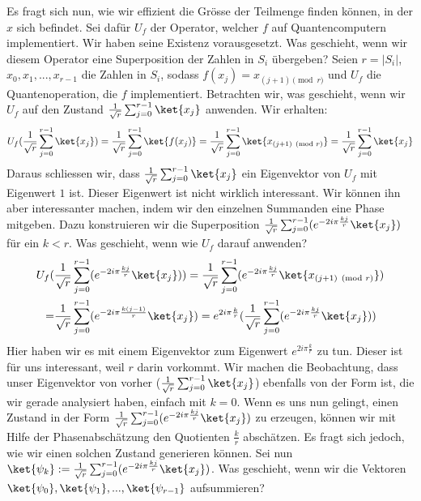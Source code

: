 Es fragt sich nun, wie wir effizient die Grösse der Teilmenge finden können, in der $x$ sich befindet. Sei dafür $U_f$ der Operator, welcher $f$ auf Quantencomputern implementiert. Wir haben seine Existenz vorausgesetzt. Was geschieht, wenn wir diesem Operator eine Superposition der Zahlen in $S_i$ übergeben? Seien $r = |S_i|$, $x_0, x_1, ..., x_{r - 1}$ die Zahlen in $S_i$, sodass $f(x_j) = x_{(j + 1) \pmod{r}}$ und $U_f$ die Quantenoperation, die $f$ implementiert. Betrachten wir, was geschieht, wenn wir $U_f$ auf den Zustand $\frac{1}{\sqrt{r}}\sum_{j = 0}^{r - 1}\ket{x_j}$ anwenden. Wir erhalten:
\begin{align*}
    U_f(\frac{1}{\sqrt{r}}\sum_{j = 0}^{r - 1}\ket{x_j}) = \frac{1}{\sqrt{r}}\sum_{j = 0}^{r - 1}\ket{f(x_j)} = \frac{1}{\sqrt{r}}\sum_{j = 0}^{r - 1}\ket{x_{(j + 1) \pmod{r}}} = \frac{1}{\sqrt{r}}\sum_{j = 0}^{r - 1}\ket{x_j}
\end{align*}
Daraus schliessen wir, dass $\frac{1}{\sqrt{r}}\sum_{j = 0}^{r - 1}\ket{x_j}$ ein Eigenvektor von $U_f$ mit Eigenwert $1$ ist. Dieser Eigenwert ist nicht wirklich interessant. Wir können ihn aber interessanter machen, indem wir den einzelnen Summanden eine Phase mitgeben. Dazu konstruieren wir die Superposition $\frac{1}{\sqrt{r}}\sum_{j = 0}^{r - 1}(e^{-2i\pi\frac{kj}{r}}\ket{x_j})$ für ein $k < r$. Was geschieht, wenn wie $U_f$ darauf anwenden? 
\begin{align*}
    U_f(&\frac{1}{\sqrt{r}}\sum_{j = 0}^{r - 1}(e^{-2i\pi\frac{kj}{r}}\ket{x_j})) = \frac{1}{\sqrt{r}}\sum_{j = 0}^{r - 1}(e^{-2i\pi\frac{kj}{r}}\ket{x_{(j + 1) \pmod{r}}}) \\ =
    &\frac{1}{\sqrt{r}}\sum_{j = 0}^{r - 1}(e^{-2i\pi\frac{k(j - 1)}{r}}\ket{x_j}) = e^{2i\pi\frac{k}{r}}(\frac{1}{\sqrt{r}}\sum_{j = 0}^{r - 1}(e^{-2i\pi\frac{kj}{r}}\ket{x_j}))
\end{align*}
Hier haben wir es mit einem Eigenvektor zum Eigenwert $e^{2i\pi\frac{k}{r}}$ zu tun. Dieser ist für uns interessant, weil $r$ darin vorkommt. Wir machen die Beobachtung, dass unser Eigenvektor von vorher ($\frac{1}{\sqrt{r}}\sum_{j = 0}^{r - 1}\ket{x_j}$) ebenfalls von der Form ist, die wir gerade analysiert haben, einfach mit $k = 0$. Wenn es uns nun gelingt, einen Zustand in der Form $\frac{1}{\sqrt{r}}\sum_{j = 0}^{r - 1}(e^{-2i\pi\frac{kj}{r}}\ket{x_j})$ zu erzeugen, können wir mit Hilfe der Phasenabschätzung den Quotienten $\frac{k}{r}$ abschätzen. Es fragt sich jedoch, wie wir einen solchen Zustand generieren können. Sei nun $\ket{\psi_k} := \frac{1}{\sqrt{r}}\sum_{j = 0}^{r - 1}(e^{-2i\pi\frac{kj}{r}}\ket{x_j})$. Was geschieht, wenn wir die Vektoren $\ket{\psi_0}, \ket{\psi_1}, ..., \ket{\psi_{r - 1}}$ aufsummieren?
